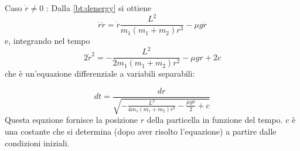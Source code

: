 \documentclass[../main.tex]{subfiles}
\begin{document}
Caso  $\dot r \neq 0$ :
Dalla \cref{bt:denergy} si ottiene
\begin{equation}
\dot r\ddot r=\dot r\frac{L^2}{m_1(m_1+m_2)r^3}-\mu g\dot r
\end{equation}
e, integrando nel tempo
\begin{equation}
2\dot r^2=-\frac{L^2}{2m_1(m_1+m_2)r^2}-\mu gr+2c
\end{equation}
che \`e un'equazione differenziale a variabili separabili:

\begin{equation}
dt=\frac{dr}{\sqrt{-\frac{L^2}{4m_1(m_1+m_2)r^2}-\frac{\mu gr} 2+c}}
\end{equation}
Questa equzione fornisce la posizione $r$ della particella in funzione del tempo. $c$ \`e una costante che si determina (dopo aver risolto l'equazione) a partire dalle condizioni iniziali.
\end{document}
